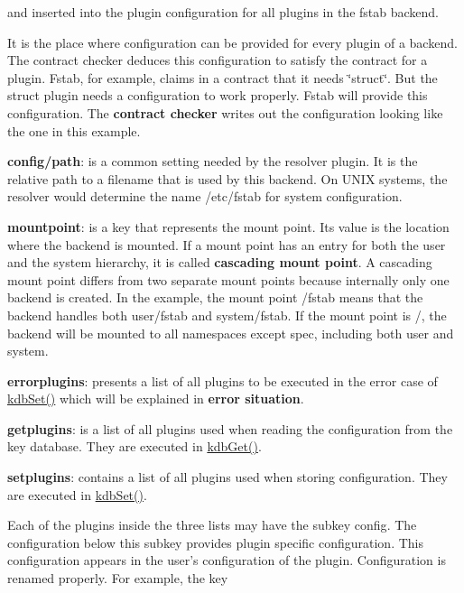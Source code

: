 and inserted into the plugin configuration for all plugins in the {\ttfamily fstab} backend.

It is the place where configuration can be provided for every plugin of a backend. The contract checker deduces this configuration to satisfy the contract for a plugin. Fstab, for example, claims in a contract that it needs \char`\"{}struct\char`\"{}. But the struct plugin needs a configuration to work properly. Fstab will provide this configuration. The {\bfseries contract checker} writes out the configuration looking like the one in this example.


\begin{DoxyItemize}
\item {\bfseries config/path}\+: is a common setting needed by the resolver plugin. It is the relative path to a filename that is used by this backend. On U\+N\+I\+X systems, the resolver would determine the name {\ttfamily /etc/fstab} for system configuration.
\item {\bfseries mountpoint}\+: is a key that represents the mount point. Its value is the location where the backend is mounted. If a mount point has an entry for both the user and the system hierarchy, it is called {\bfseries cascading mount point}. A cascading mount point differs from two separate mount points because internally only one backend is created. In the example, the mount point {\ttfamily /fstab} means that the backend handles both {\ttfamily user/fstab} and {\ttfamily system/fstab}. If the mount point is {\ttfamily /}, the backend will be mounted to all namespaces except {\ttfamily spec}, including both {\ttfamily user} and {\ttfamily system}.
\item {\bfseries errorplugins}\+: presents a list of all plugins to be executed in the error case of {\ttfamily \hyperlink{group__kdb_ga11436b058408f83d303ca5e996832bcf}{kdb\+Set()}} which will be explained in {\bfseries error situation}.
\item {\bfseries getplugins}\+: is a list of all plugins used when reading the configuration from the key database. They are executed in {\ttfamily \hyperlink{group__kdb_ga28e385fd9cb7ccfe0b2f1ed2f62453a1}{kdb\+Get()}}.
\item {\bfseries setplugins}\+: contains a list of all plugins used when storing configuration. They are executed in {\ttfamily \hyperlink{group__kdb_ga11436b058408f83d303ca5e996832bcf}{kdb\+Set()}}.
\end{DoxyItemize}

Each of the plugins inside the three lists may have the subkey {\ttfamily config}. The configuration below this subkey provides plugin specific configuration. This configuration appears in the user's configuration of the plugin. Configuration is renamed properly. For example, the key 


